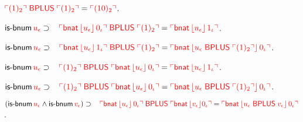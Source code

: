 \begin{biformthy}
    \item $\textcolor{red}{\ulcorner(1)_2\urcorner \; \mbox{\sf BPLUS} \;
      \ulcorner(1)_2\urcorner} = \textcolor{red}{\ulcorner(10)_2\urcorner}$.

    \item $\mbox{\sf is-bnum} \, \textcolor{red}{u_\epsilon} \supset {}\\
        \hspace*{2ex} \textcolor{red}{\ulcorner\mbox{\sf bnat} \,
            \lfloor u_\epsilon\rfloor \, 0_\iota\urcorner \; \mbox{\sf BPLUS} \;
          \ulcorner(1)_2\urcorner} = \textcolor{red}{\ulcorner\mbox{\sf bnat} \,
            \lfloor u_\epsilon\rfloor \, 1_\iota\urcorner}$.

    \item $\mbox{\sf is-bnum} \, \textcolor{red}{u_\epsilon} \supset {}\\
        \hspace*{2ex} \textcolor{red}{\ulcorner\mbox{\sf bnat} \,
            \lfloor u_\epsilon\rfloor \, 1_\iota\urcorner \; \mbox{\sf BPLUS} \;
          \ulcorner(1)_2\urcorner} = \textcolor{red}{\ulcorner\mbox{\sf bnat} \,
            \lfloor u_\epsilon \; \mbox{\sf BPLUS} \;
              \ulcorner(1)_2\urcorner\rfloor \, 0_\iota\urcorner}$.

    \item $\mbox{\sf is-bnum} \, \textcolor{red}{u_\epsilon} \supset {}\\
        \hspace*{2ex} \textcolor{red}{\ulcorner(1)_2\urcorner \; \mbox{\sf BPLUS} \;
          \ulcorner\mbox{\sf bnat} \, \lfloor u_\epsilon\rfloor \, 0_\iota\urcorner} =
        \textcolor{red}{\ulcorner\mbox{\sf bnat} \, \lfloor u_\epsilon\rfloor \,
            1_\iota\urcorner}$.

    \item $\mbox{\sf is-bnum} \, \textcolor{red}{u_\epsilon} \supset {}\\
        \hspace*{2ex} \textcolor{red}{\ulcorner(1)_2\urcorner \; \mbox{\sf BPLUS} \;
          \ulcorner\mbox{\sf bnat} \, \lfloor u_\epsilon\rfloor \, 0_\iota\urcorner} =
        \textcolor{red}{\ulcorner\mbox{\sf bnat} \, \lfloor u_\epsilon \;
              \mbox{\sf BPLUS} \; \ulcorner(1)_2\urcorner\rfloor \, 0_\iota\urcorner}$.

    \item $(\mbox{\sf is-bnum} \, \textcolor{red}{u_\epsilon} \wedge \mbox{\sf is-bnum}
      \, \textcolor{red}{v_\epsilon}) \supset {}\\
        \hspace*{2ex} \textcolor{red}{\ulcorner\mbox{\sf bnat} \,
            \lfloor u_\epsilon\rfloor \, 0_\iota\urcorner \; \mbox{\sf BPLUS} \;
          \ulcorner\mbox{\sf bnat} \, \lfloor v_\epsilon\rfloor 0_\iota\urcorner} =
        \textcolor{red}{\ulcorner\mbox{\sf bnat} \, \lfloor u_\epsilon \;
              \mbox{\sf BPLUS} \; v_\epsilon\rfloor \, 0_\iota\urcorner}$.


\end{biformthy}
